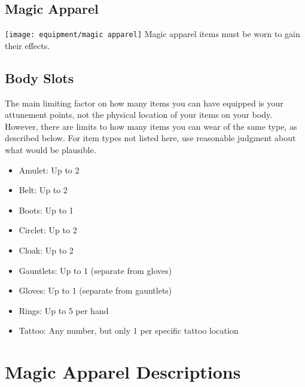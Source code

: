       

      \begin{longcolumn}
        \section{Magic Apparel}
          \begin{longtablepreface}
            \texttt{[image: equipment/magic apparel]}
            Magic apparel items must be worn to gain their effects.

            \subsection{Body Slots}\label{Body Slots}
              The main limiting factor on how many items you can have equipped is your attunement points, not the physical location of your items on your body.
              However, there are limits to how many items you can wear of the same type, as described below.
              For item types not listed here, use reasonable judgment about what would be plausible.
              \begin{itemize}
                \item Amulet: Up to 2
                \item Belt: Up to 2
                \item Boots: Up to 1
                \item Circlet: Up to 2
                \item Cloak: Up to 2
                \item Gauntlets: Up to 1 (separate from gloves)
                \item Gloves: Up to 1 (separate from gauntlets)
                \item Rings: Up to 5 per hand
                \item Tattoo: Any number, but only 1 per specific tattoo location
              \end{itemize}
          \end{longtablepreface}

          

      \end{longcolumn}
\section{Magic Apparel Descriptions}

